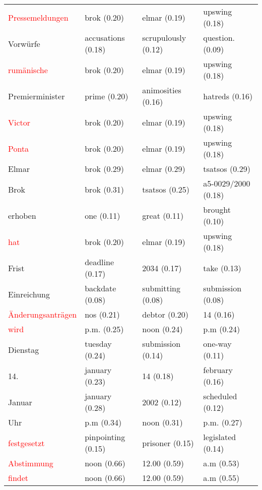 \documentclass[11pt,twoside,openright]{mpreport}
\begin{document}
\begin{scriptsize}
\begin{tabular}{|llll|}
\textcolor{red}{Pressemeldungen}         & brok (0.20) & elmar (0.19) & upswing (0.18) \\
Vorwürfe               & accusations (0.18) & scrupulously (0.12) & question. (0.09) \\ %
\textcolor{red}{rumänische}             & brok (0.20) & elmar (0.19) & upswing (0.18) \\
Premierminister         & prime (0.20) & animosities (0.16) & hatreds (0.16) \\ %
\textcolor{red}{Victor}                  & brok (0.20) & elmar (0.19) & upswing (0.18) \\
\textcolor{red}{Ponta}                   & brok (0.20) & elmar (0.19) & upswing (0.18) \\
Elmar                   & brok (0.29) & elmar (0.29) & tsatsos (0.29) \\ %
Brok                    & brok (0.31) & tsatsos (0.25) & a5-0029/2000 (0.18) \\ %
erhoben                 & one (0.11) & great (0.11) & brought (0.10) \\ %
\textcolor{red}{hat}                     & brok (0.20) & elmar (0.19) & upswing (0.18) \\
Frist                   & deadline (0.17) & 2034 (0.17) & take (0.13) \\ %
Einreichung             & backdate (0.08) & submitting (0.08) & submission (0.08) \\ %
\textcolor{red}{Änderungsanträgen}     & nos (0.21) & debtor (0.20) & 14 (0.16) \\
\textcolor{red}{wird}                    & p.m. (0.25) & noon (0.24) & p.m (0.24) \\
Dienstag                & tuesday (0.24) & submission (0.14) & one-way (0.11) \\ %
14.                     & january (0.23) & 14 (0.18) & february (0.16) \\ %
Januar                  & january (0.28) & 2002 (0.12) & scheduled (0.12) \\ %
Uhr                     & p.m (0.34) & noon (0.31) & p.m. (0.27) \\ %
\textcolor{red}{festgesetzt}             & pinpointing (0.15) & prisoner (0.15) & legislated (0.14) \\ %
\textcolor{red}{Abstimmung}              & noon (0.66) & 12.00 (0.59) & a.m (0.53) \\
\textcolor{red}{findet}                  & noon (0.66) & 12.00 (0.59) & a.m (0.55) \\

\end{tabular}
\end{scriptsize}
\end{document}
